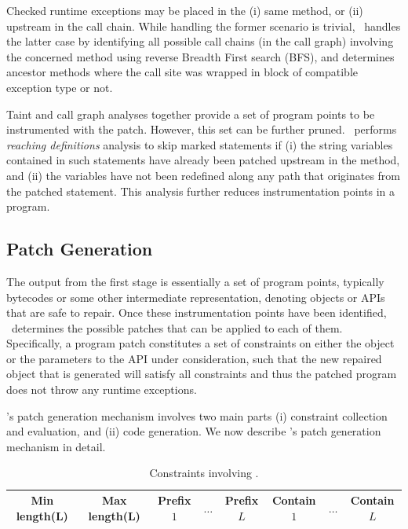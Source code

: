 Checked runtime exceptions may be placed in the (i) same method, or (ii)
upstream in the call chain. While handling the former scenario is trivial,
\tool\ handles the latter case by identifying all possible call chains (in
the call graph) involving the concerned method using reverse Breadth First
search (BFS), and determines ancestor methods where the call site was wrapped in
 block of compatible exception type or not.

 Taint and call graph analyses
together provide a set of program points to be instrumented with the
patch. However, this set can be further pruned. \tool\ performs \textit{reaching
definitions} analysis to skip marked statements if
(i) the string variables contained in such statements have already been patched
upstream in the method, and (ii) the variables have not been redefined along any
path that originates from the patched statement. This analysis further reduces
instrumentation points in a program.

\subsection{Patch Generation}
\label{sec:tool:stage2}

The output from the first stage is essentially a set of program points,
typically bytecodes or some other intermediate representation, denoting
 objects or APIs that are safe to repair. Once these
instrumentation points have been identified, \tool\ determines the
possible patches that can be applied to each of them. Specifically, a program
patch constitutes a set of constraints on either the  object or the
parameters to the  API under consideration, such that the new
repaired  object that is generated will satisfy all constraints and
thus the patched program does not throw any runtime exceptions.

\tool's patch generation mechanism involves two main parts (i) constraint
collection and evaluation, and (ii) code generation. We now describe \tool's
patch generation mechanism in detail. 


\begin{table}[t]
\centering
\caption{Constraints involving .}
\scriptsize
\setlength{\tabcolsep}{2.5pt}
\begin{tabular}{|c|c|c|c|c|c|c|c|}
\hline
Min length(L) & Max length(L) &
Prefix $1$ & $\ldots$ & Prefix$L$ &
Contain $1$ & $\ldots$ & Contain $L$
\\
\hline
\end{tabular}
\label{table:constraint}
\end{table}

